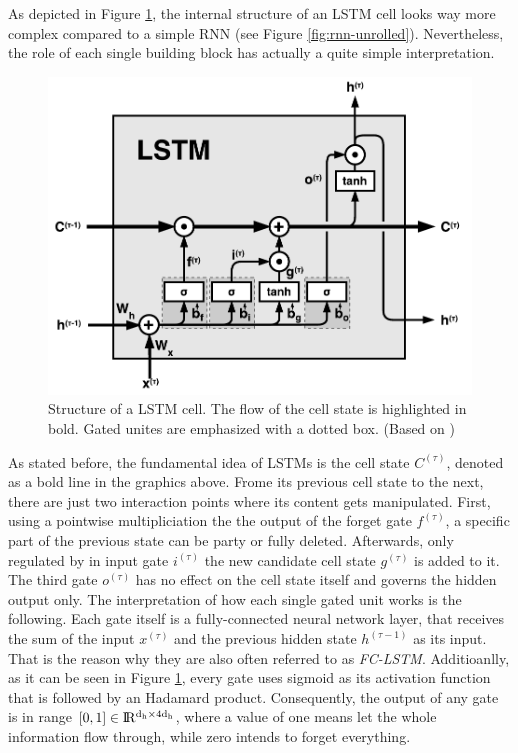 

As depicted in Figure \ref{fig:lstm}, the internal structure of an LSTM cell looks way more complex compared to a simple RNN (see Figure \ref{fig:rnn-unrolled}). Nevertheless, the role of each single building block has actually a quite simple interpretation.

\begin{figure}[htpb]
	\centering
	\includegraphics[scale=0.8]{figures/lstm.pdf}
	\caption[Structure of a LSLTM cell]{Structure of a LSTM cell. The flow of the cell state is highlighted in bold. Gated unites are emphasized with a dotted box. (Based on \parencite{understand_lstm})} \label{fig:lstm}
\end{figure}

As stated before, the fundamental idea of LSTMs is the cell state $C^{(\tau)}$, denoted as a bold line in the graphics above. Frome its previous cell state to the next, there are just two interaction points where its content gets manipulated. First, using a pointwise multipliciation the the output of the forget gate $f^{(\tau)}$, a specific part of the previous state can be party or fully deleted. Afterwards, only regulated by in input gate $ i^{(\tau)} $ the new candidate cell state $ g^{(\tau)} $ is added to it. The third gate $ o^{(\tau)} $ has no effect on the cell state itself and governs the hidden output only.
The interpretation of how each single gated unit works is the following. Each gate itself is a fully-connected neural network layer, that receives the sum of the input $x^{(\tau)}$ and the previous hidden state $h^{(\tau-1)}$ as its input. That is the reason why they are also often referred to as \textit{FC-LSTM}. Additioanlly, as it can be seen in Figure \ref{fig:lstm}, every gate uses sigmoid as its activation function that is followed by an Hadamard product. Consequently, the output of any gate is in range $ [0, 1] \in \rm I\!R^{d_h \times 4d_h} $, where a value of one means let the whole information flow through, while zero intends to forget everything. 

